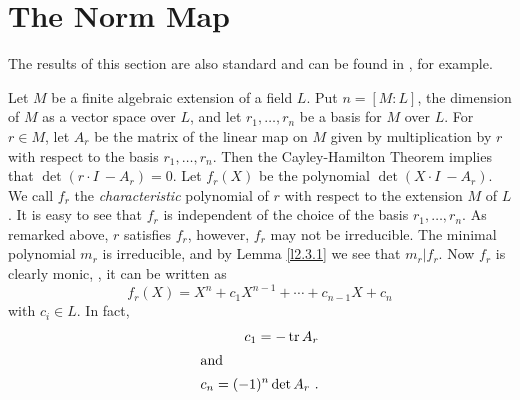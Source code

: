 %
%


\section{The Norm Map}
\label{sec2.5}

The results of this section are also standard and can be found in \cite{r2.17}, for example.

Let $M$ be a finite algebraic extension of a field $L$. Put $n=[M:L]$, the dimension of $M$ as a vector space over $L$, and let $r_{1}, \ldots, r_{n}$ be a basis for $M$ over $L$. For $r\in M$, let $A_{r}$ be the matrix of the linear map on $M$ given by multiplication by $r$ with respect to the basis $r_{1}, \ldots, r_{n}$. Then the Cayley-Hamilton Theorem implies that $\det(r\cdot I\ -A_{r})=0$. Let $f_{r}(X)$ be the polynomial $\det(X\cdot I\ -A_{r})$. We call $f_{r}$ the {\it characteristic} polynomial of $r$ with respect to the extension $M$ of $L$. It is easy to see that $f_{r}$ is independent of the choice of the basis $r_{1}, \ldots, r_{n}$. As remarked above, $r$ satisfies $f_{r}$, however, $f_{r}$ may not be irreducible. The minimal polynomial $m_{r}$ is irreducible, and by Lemma \ref{l2.3.1} we see that $m_{r}|f_{r}$. Now $f_{r}$ is clearly monic, \ie, it can be written as
$$
f_{r}(X)=X^{n}+c_{1}X^{n-1}+\cdots+c_{n-1}X+c_{n}
$$
with $c_{i}\in L$. In fact,
\begin{align*}
c_{1}= -\operatorname{tr} A_{r} \\
\intertext{and}
c_{n}=(-1)^{n}\det A_{r}\ .
\end{align*}

